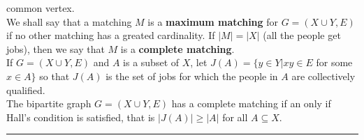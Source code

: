 \documentclass[10pt,landscape]{article}
\begin{document}
\begin{multicols}{4}
common vertex.\\
We shall say that a matching $M$ is a \textbf{maximum matching} for $G
=(X \cup Y,E)$ if no other matching has a greated cardinality. If $|M|
= |X|$ (all the people get jobs), then we say that $M$ is a
\textbf{complete matching}.\\
If $G = (X \cup Y, E)$ and $A$ is a subset of $X$, let $J(A) = \{y \in
Y | xy \in E$ for some $x \in A\}$ so that $J(A)$ is the set of jobs
for which the people in $A$ are collectively qualified.\\
The bipartite graph $G = (X \cup Y, E)$ has a complete matching if an
only if Hall's condition is satisfied, that is $|J(A)| \geq |A|$ for
all $A \subseteq X$.\\ 




\rule{0.3\linewidth}{0.25pt}
\scriptsize


\end{multicols}
\end{document}
